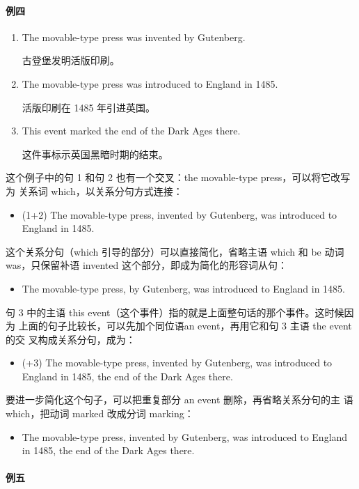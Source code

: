 \paragraph{例四}

\begin{enumerate}
\item The movable-type press was invented by Gutenberg.

  古登堡发明活版印刷。
\item The movable-type press was introduced to England in 1485.

  活版印刷在 1485 年引进英国。
\item This event marked the end of the Dark Ages there.

  这件事标示英国黑暗时期的结束。
\end{enumerate}

这个例子中的句 1 和句 2 也有一个交叉：the movable-type press，可以将它改写为
关系词 which，以关系分句方式连接：
\begin{itemize}
\item (1+2) The movable-type press,  invented by Gutenberg, was
  introduced to England in 1485.
\end{itemize}
这个关系分句（which 引导的部分）可以直接简化，省略主语 which 和 be 动词
was，只保留补语 invented 这个部分，即成为简化的形容词从句：
\begin{itemize}
\item The movable-type press,  by Gutenberg, was introduced to England
  in 1485.
\end{itemize}
句 3 中的主语 this event（这个事件）指的就是上面整句话的那个事件。这时候因为
上面的句子比较长，可以先加个同位语an event，再用它和句 3 主语 the event 的交
叉构成关系分句，成为：
\begin{itemize}
\item (+3) The movable-type press, invented by Gutenberg, was introduced to
  England in 1485,  the end of the Dark Ages there.
\end{itemize}
要进一步简化这个句子，可以把重复部分 an event 删除，再省略关系分句的主
语which，把动词 marked 改成分词 marking：
\begin{itemize}
\item   The movable-type press, invented by Gutenberg, was introduced to
  England in 1485,  the end of the Dark Ages there.
\end{itemize}

\paragraph{例五}

